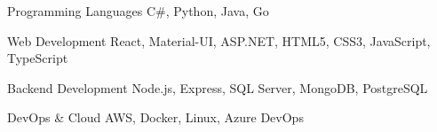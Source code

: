 
\begin{cvskills}
	
	\cvskill
	{Programming Languages} %
	{C\#, Python, Java, Go}
	
	\cvskill
	{Web Development} %
	{React, Material-UI, ASP.NET, HTML5, CSS3, JavaScript, TypeScript}
	
	\cvskill
	{Backend Development} %
	{Node.js, Express, SQL Server, MongoDB, PostgreSQL}
	
	\cvskill
	{DevOps \& Cloud} %
	{AWS, Docker, Linux, Azure DevOps}
	
\end{cvskills}
